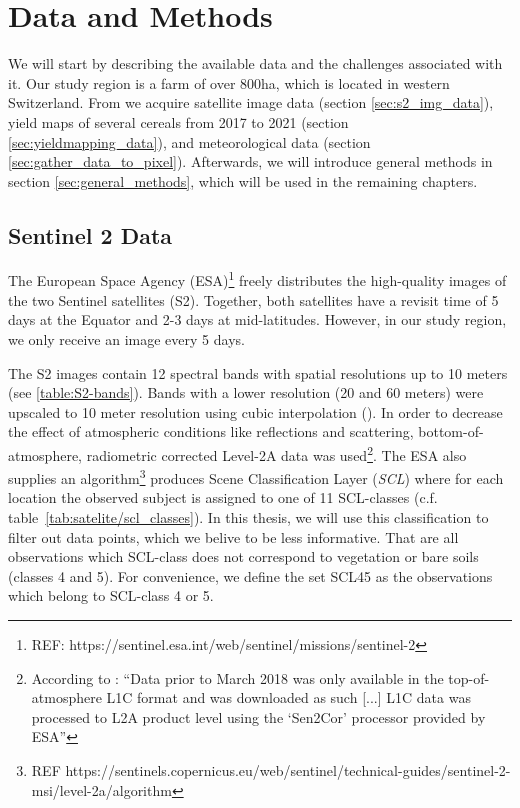 \chapter{Data and Methods}\label{sec:data_methods}
{
	We will start by describing the available data and the challenges associated with it.
	Our study region is a farm of over 800ha, which is located in western Switzerland. From \cite{perichPixelbasedYieldMapping2022a} we acquire satellite image data (section \ref{sec:s2_img_data}), yield maps of several cereals from 2017 to 2021 (section \ref{sec:yieldmapping_data}), and meteorological data (section \ref{sec:gather_data_to_pixel}).
	Afterwards, we will introduce general methods in section \ref{sec:general_methods}, which will be used in the remaining chapters.
}


\section{Sentinel 2 Data}{
	\label{sec:s2_img_data}
	{
		
		The European Space Agency (ESA)\footnote{REF: https://sentinel.esa.int/web/sentinel/missions/sentinel-2} freely distributes the high-quality images of the two Sentinel satellites (S2). Together, both satellites have a revisit time of 5 days at the Equator and 2-3 days at mid-latitudes. However, in our study region, we only receive an image every 5 days.
		
		
		
		The S2 images contain 12 spectral bands with spatial resolutions up to 10 meters (see \ref{table:S2-bands}). Bands with a lower resolution (20 and 60 meters) were upscaled to 10 meter resolution using cubic interpolation (\cite{perichPixelbasedYieldMapping2022a}). In order to decrease the effect of atmospheric conditions like reflections and scattering, bottom-of-atmosphere, radiometric corrected Level-2A data was used\footnote{According to \cite{perichPixelbasedYieldMapping2022a}: ``Data prior to March 2018 was only available in the top-of-atmosphere L1C format and was downloaded as such [...] L1C data was processed to L2A product level using the `Sen2Cor' processor provided by ESA''}. 
		The ESA also supplies an algorithm\footnote{REF https://sentinels.copernicus.eu/web/sentinel/technical-guides/sentinel-2-msi/level-2a/algorithm} produces Scene Classification Layer (\textit{SCL}) where for each location the observed subject is assigned to one of 11 SCL-classes (c.f. table~\ref{tab:satelite/scl_classes}). 
		In this thesis,  we will use this classification to filter out data points, which we belive to be less informative. That are all observations which SCL-class does not correspond to vegetation or bare soils (classes 4 and 5). For convenience, we define the set SCL45 as the observations which belong to SCL-class 4 or 5.
		
}}
